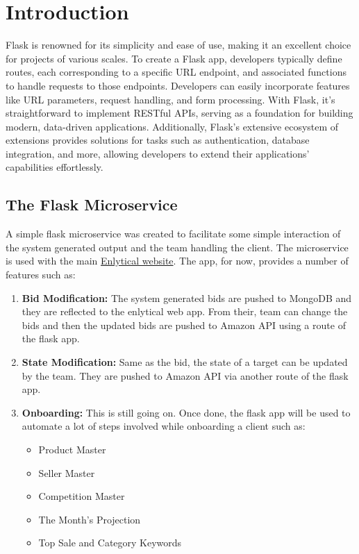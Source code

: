 \section{Introduction}

Flask is renowned for its simplicity and ease of use, making it an excellent choice for projects of various scales. To create a Flask app, developers typically define routes, each corresponding to a specific URL endpoint, and associated functions to handle requests to those endpoints. Developers can easily incorporate features like URL parameters, request handling, and form processing. With Flask, it's straightforward to implement RESTful APIs, serving as a foundation for building modern, data-driven applications. Additionally, Flask's extensive ecosystem of extensions provides solutions for tasks such as authentication, database integration, and more, allowing developers to extend their applications' capabilities effortlessly.

\subsection{The Flask Microservice}

A simple flask microservice was created to facilitate some simple interaction of the system generated output and the team handling the client. The microservice is used with the main \href{https://enlytical.com/home/app}{Enlytical website}. The app, for now, provides a number of features such as:
\begin{enumerate}
  \item \textbf{Bid Modification:} The system generated bids are pushed to MongoDB and they are reflected to the enlytical web app. From their, team can change the bids and then the updated bids are pushed to Amazon API using a route of the flask app.
  \item \textbf{State Modification:} Same as the bid, the state of a target can be updated by the team. They are pushed to Amazon API via another route of the flask app.
  \item \textbf{Onboarding:} This is still going on. Once done, the flask app will be used to automate a lot of steps involved while onboarding a client such as:
        \begin{itemize}
          \item Product Master
          \item Seller Master
          \item Competition Master
          \item The Month's Projection
          \item Top Sale and Category Keywords
        \end{itemize}
\end{enumerate}

